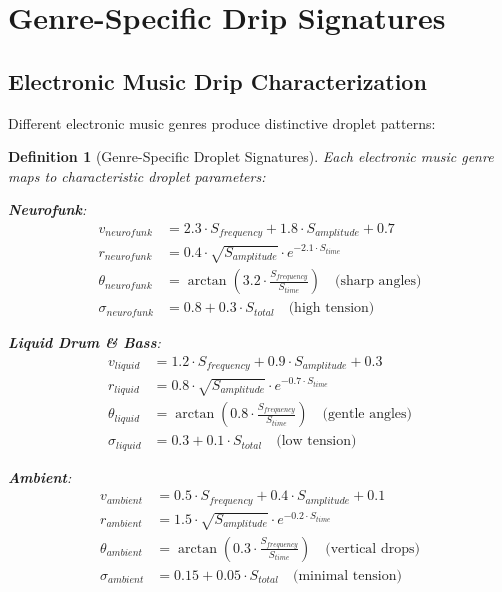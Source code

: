 \documentclass[12pt,a4paper]{article}
\newtheorem{definition}{Definition}
\begin{document}
\section{Genre-Specific Drip Signatures}

\subsection{Electronic Music Drip Characterization}

Different electronic music genres produce distinctive droplet patterns:

\begin{definition}[Genre-Specific Droplet Signatures]
Each electronic music genre maps to characteristic droplet parameters:

\textbf{Neurofunk}:
\begin{align}
v_{neurofunk} &= 2.3 \cdot S_{frequency} + 1.8 \cdot S_{amplitude} + 0.7 \\
r_{neurofunk} &= 0.4 \cdot \sqrt{S_{amplitude}} \cdot e^{-2.1 \cdot S_{time}} \\
\theta_{neurofunk} &= \arctan(3.2 \cdot \frac{S_{frequency}}{S_{time}}) \quad \text{(sharp angles)} \\
\sigma_{neurofunk} &= 0.8 + 0.3 \cdot S_{total} \quad \text{(high tension)}
\end{align}

\textbf{Liquid Drum \& Bass}:
\begin{align}
v_{liquid} &= 1.2 \cdot S_{frequency} + 0.9 \cdot S_{amplitude} + 0.3 \\
r_{liquid} &= 0.8 \cdot \sqrt{S_{amplitude}} \cdot e^{-0.7 \cdot S_{time}} \\
\theta_{liquid} &= \arctan(0.8 \cdot \frac{S_{frequency}}{S_{time}}) \quad \text{(gentle angles)} \\
\sigma_{liquid} &= 0.3 + 0.1 \cdot S_{total} \quad \text{(low tension)}
\end{align}

\textbf{Ambient}:
\begin{align}
v_{ambient} &= 0.5 \cdot S_{frequency} + 0.4 \cdot S_{amplitude} + 0.1 \\
r_{ambient} &= 1.5 \cdot \sqrt{S_{amplitude}} \cdot e^{-0.2 \cdot S_{time}} \\
\theta_{ambient} &= \arctan(0.3 \cdot \frac{S_{frequency}}{S_{time}}) \quad \text{(vertical drops)} \\
\sigma_{ambient} &= 0.15 + 0.05 \cdot S_{total} \quad \text{(minimal tension)}
\end{align}
\end{definition}
\end{document}
